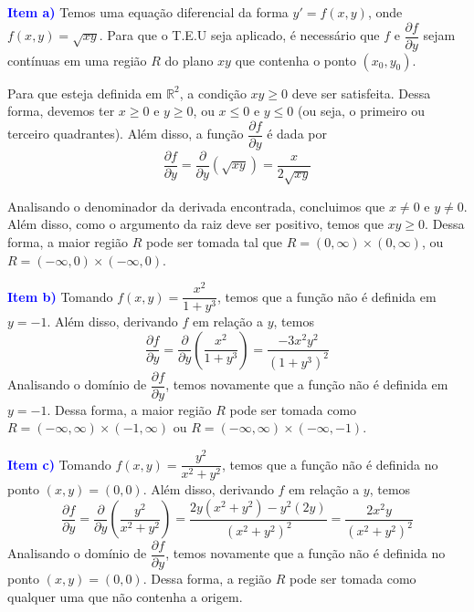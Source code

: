 \documentclass[oneside,12pt,a4paper]{report}
\begin{document}
        \begin{tcolorbox}[enhanced, breakable, colback=blue!1!white,colframe=blue!75!black,title=\textbf{\hyperlink{quest:ex7}{\hypertarget{resp:ex7}{Exercício 7}}}]

        \noindent\textcolor{blue}{\textbf{Item a)}} Temos uma equação diferencial da forma $y' = f(x,y)$, onde $f(x,y) = \sqrt{xy}$. Para que o T.E.U seja aplicado, é necessário que $f$ e $\dfrac{\partial f}{\partial y}$ sejam contínuas em uma região $R$ do plano $xy$ que contenha o ponto $(x_0, y_0)$.

        \noindent Para que esteja definida em $\mathbb{R}^2$, a condição $xy \geq 0$ deve ser satisfeita. Dessa forma, devemos ter $x \geq 0$ e $y \geq 0$, ou $x \leq 0$ e $y \leq 0$ (ou seja, o primeiro ou terceiro quadrantes). Além disso, a função $\dfrac{\partial f}{\partial y}$ é dada por
        \[\frac{\partial f}{\partial y} = \frac{\partial}{\partial y}(\sqrt{xy}) = \frac{x}{2\sqrt{xy}}\]

        \noindent Analisando o denominador da derivada encontrada, concluimos que $x\neq 0$ e $y\neq0$. Além disso, como o argumento da raiz deve ser positivo, temos que $xy\geq0$. Dessa forma, a maior região $R$ pode ser tomada tal que $R=(0, \infty) \times (0, \infty)$, ou $R=(-\infty, 0) \times (-\infty, 0)$.

        \noindent\textcolor{blue}{\textbf{Item b)}} Tomando $f(x,y) = \dfrac{x^2}{1+y^3}$, temos que a função não é definida em $y=-1$. Além disso, derivando $f$ em relação a $y$, temos
        \[\frac{\partial f}{\partial y} = \frac{\partial}{\partial y}\left(\frac{x^2}{1+y^3}\right) = \frac{-3x^2y^2}{(1+y^3)^2}\]
        \noindent Analisando o domínio de $\dfrac{\partial f}{\partial y}$, temos novamente que a função não é definida em $y=-1$. Dessa forma, a maior região $R$ pode ser tomada como $R=(-\infty, \infty) \times (-1, \infty)$ ou $R=(-\infty, \infty) \times (-\infty, -1)$.

        \noindent\textcolor{blue}{\textbf{Item c)}} Tomando $f(x,y) = \dfrac{y^2}{x^2+y^2}$, temos que a função não é definida no ponto $(x, y)=(0,0)$. Além disso, derivando $f$ em relação a $y$, temos
        \[\frac{\partial f}{\partial y} = \frac{\partial}{\partial y}\left(\frac{y^2}{x^2+y^2}\right) = \frac{2y(x^2+y^2)-y^2(2y)}{(x^2+y^2)^2}=\frac{2x^2y}{(x^2+y^2)^2}\]
        \noindent Analisando o domínio de $\dfrac{\partial f}{\partial y}$, temos novamente que a função não é definida no ponto $(x, y)=(0,0)$. Dessa forma, a região $R$ pode ser tomada como qualquer uma que não contenha a origem.

        \end{tcolorbox}
\end{document}
